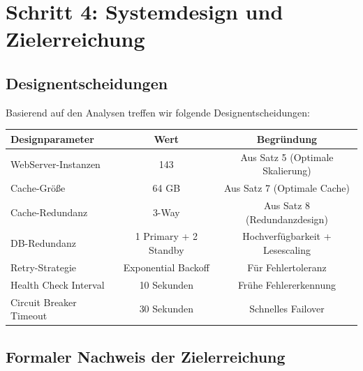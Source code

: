 \documentclass[a4paper,11pt]{article}
\theoremstyle{definition}
\begin{document}
    

\section{Schritt 4: Systemdesign und Zielerreichung}

\subsection{Designentscheidungen}

Basierend auf den Analysen treffen wir folgende Designentscheidungen:

\begin{table}[H]
    \centering
    \begin{tabular}{|l|c|c|}
        \hline
        \textbf{Designparameter} & \textbf{Wert} & \textbf{Begründung} \\
        \hline
        WebServer-Instanzen & 143 & Aus Satz 5 (Optimale Skalierung) \\
        Cache-Größe & 64 GB & Aus Satz 7 (Optimale Cache) \\
        Cache-Redundanz & 3-Way & Aus Satz 8 (Redundanzdesign) \\
        DB-Redundanz & 1 Primary + 2 Standby & Hochverfügbarkeit + Lesescaling \\
        Retry-Strategie & Exponential Backoff & Für Fehlertoleranz \\
        Health Check Interval & 10 Sekunden & Frühe Fehlererkennung \\
        Circuit Breaker Timeout & 30 Sekunden & Schnelles Failover \\
        \hline
    \end{tabular}
\end{table}

\subsection{Formaler Nachweis der Zielerreichung}
\end{document}
